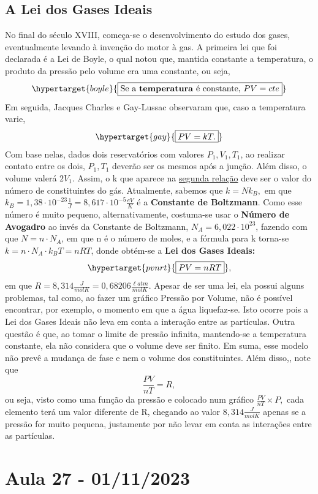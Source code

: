 \documentclass{article}
\begin{document}
\subsection{A Lei dos Gases Ideais}
No final do século XVIII, começa-se o desenvolvimento do estudo dos gases, eventualmente levando à invenção do motor à gas. A primeira lei que foi declarada
é a Lei de Boyle, o qual notou que, mantida constante a temperatura, o produto da pressão pelo volume era uma constante, ou seja, 
\[
  \hypertarget{boyle}{\boxed{\text{Se a \textbf{temperatura} é constante, }PV = cte}}
\]
Em seguida, Jacques Charles e Gay-Lussac observaram que, caso a temperatura varie, 
\[
  \hypertarget{gay}{\boxed{PV = kT.}}
\]
Com base nelas, dados dois reservatórios com valores \(P_{1}, V_{1}, T_{1}\), ao realizar contato entre os dois, \(P_{1}, T_{1}\) deverão ser os mesmos após a junção.
Além disso, o volume valerá \(2V_{1}.\) Assim, o k que aparece na \hyperlink{gay}{segunda relação} deve ser o valor do número de constituintes do gás. Atualmente, sabemos que 
\(k = Nk_{B},\) em que \(k_{B} = 1,38 \cdot 10^{-23}\frac{1}{J} = 8,617 \cdot 10^{-5}\frac{eV}{K}\) é a \textbf{Constante de Boltzmann}. Como esse número é muito pequeno, alternativamente,
costuma-se usar o \textbf{Número de Avogadro } ao invés da Constante de Boltzmann, \(N_{A} = 6,022 \cdot 10^{23}\), fazendo com que \(N = n \cdot N_{A}\), em que n é o número
de moles, e a fórmula para k torna-se \(k = n \cdot N_{A} \cdot k_{B} T = nRT\), donde obtém-se a \textbf{Lei dos Gases Ideais:}
\[
  \hypertarget{pvnrt}{\boxed{PV = nRT}},
\]
em que \(R = 8,314 \frac{J}{molK} = 0,68206 \frac{\ell atm}{mol K}\). Apesar de ser uma lei, ela possui alguns problemas, tal como, ao fazer um gráfico Pressão por Volume,
não é possível encontrar, por exemplo, o momento em que a água liquefaz-se. Isto ocorre pois a Lei dos Gases Ideais não leva em conta a interação entre as partículas. Outra questão
é que, ao tomar o limite de pressão infinita, mantendo-se a temperatura constante, ela não considera que o volume deve ser finito. Em suma, esse modelo não prevê a mudança de fase
e nem o volume dos constituintes. Além disso,, note que 
\[
  \frac{PV}{nT} = R,
\]
ou seja, visto como uma função da pressão e colocado num gráfico \(\frac{PV}{nT}\times P,\) cada elemento terá um valor diferente de R, chegando ao valor \(8,314 \frac{J}{mol K}\) apenas
se a pressão for muito pequena, justamente por não levar em conta as interações entre as partículas.
\newpage

\section{Aula 27 - 01/11/2023}
\end{document}

